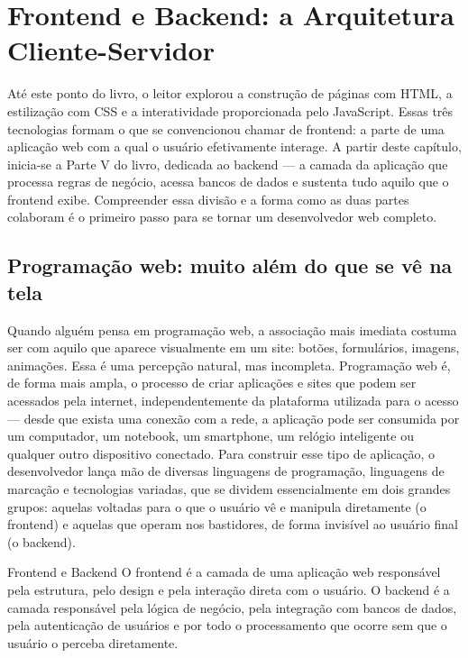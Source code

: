 \chapter{Frontend e Backend: a Arquitetura Cliente-Servidor}

Até este ponto do livro, o leitor explorou a construção de páginas com HTML, a estilização com CSS e a interatividade proporcionada pelo JavaScript. Essas três tecnologias formam o que se convencionou chamar de frontend: a parte de uma aplicação web com a qual o usuário efetivamente interage. A partir deste capítulo, inicia-se a Parte V do livro, dedicada ao backend — a camada da aplicação que processa regras de negócio, acessa bancos de dados e sustenta tudo aquilo que o frontend exibe. Compreender essa divisão e a forma como as duas partes colaboram é o primeiro passo para se tornar um desenvolvedor web completo.

\section{Programação web: muito além do que se vê na tela}

Quando alguém pensa em programação web, a associação mais imediata costuma ser com aquilo que aparece visualmente em um site: botões, formulários, imagens, animações. Essa é uma percepção natural, mas incompleta. Programação web é, de forma mais ampla, o processo de criar aplicações e sites que podem ser acessados pela internet, independentemente da plataforma utilizada para o acesso — desde que exista uma conexão com a rede, a aplicação pode ser consumida por um computador, um notebook, um smartphone, um relógio inteligente ou qualquer outro dispositivo conectado. Para construir esse tipo de aplicação, o desenvolvedor lança mão de diversas linguagens de programação, linguagens de marcação e tecnologias variadas, que se dividem essencialmente em dois grandes grupos: aquelas voltadas para o que o usuário vê e manipula diretamente (o frontend) e aquelas que operam nos bastidores, de forma invisível ao usuário final (o backend).

\begin{infobox}{Frontend e Backend}
O frontend é a camada de uma aplicação web responsável pela estrutura, pelo design e pela interação direta com o usuário. O backend é a camada responsável pela lógica de negócio, pela integração com bancos de dados, pela autenticação de usuários e por todo o processamento que ocorre sem que o usuário o perceba diretamente.
\end{infobox}

